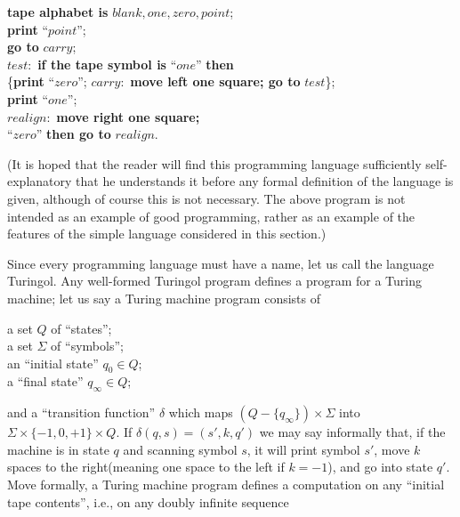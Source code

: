 \documentclass[a4paper]{article}
\begin{document}
\begin{center}
\begin{minipage}{13cm}
{\bfseries tape alphabet is} $blank, one, zero, point$; \\
{\bfseries print} ``$point$''; \\
{\bfseries go to} $carry$; \\
$test:$ {\bfseries if the tape symbol is} ``$one$'' {\bfseries then} \\
\hspace*{5em}\{{\bfseries print} ``$zero$''; $carry:$ {\bfseries move left one square; go to} $test$\}; \\
{\bfseries print} ``$one$''; \\
$realign:$ {\bfseries move right one square;} \\
\hspace*{2.5em}{\bfseries if the tape symbol is} ``$zero$'' {\bfseries then go to} $realign$.
\end{minipage}
\end{center}
(It is hoped that the reader will find this programming language sufficiently
self-explanatory that he understands it before any formal definition of the
language is given, although of course this is not necessary. The above program
is not intended as an example of good programming, rather as an example of the
features of the simple language considered in this section.)

Since every programming language must have a name, let us call the language
Turingol. Any well-formed Turingol program defines a program for a Turing
machine; let us say a Turing machine program consists of

\begin{center}
\begin{minipage}{5cm}
a set $Q$ of ``states'';\\
a set $\Sigma$ of ``symbols'';\\
an ``initial state'' $q_0 \in Q$;\\
a ``final state'' $q_\infty \in Q$;
\end{minipage}
\end{center}
and a ``transition function'' $\delta$ which maps $(Q - \{q_\infty\}) \times
\Sigma$ into $\Sigma \times \{-1,0,+1\} \times Q$. If $\delta(q,s) = (s',k,q')$
we may say informally that, if the machine is in state $q$ and scanning symbol
$s$, it will print symbol $s'$, move $k$ spaces to the right(meaning one space
to the left if $k=-1$), and go into state $q'$. Move formally, a Turing machine
program defines a computation on any ``initial tape contents'', i.e., on any
doubly infinite sequence
\end{document}

